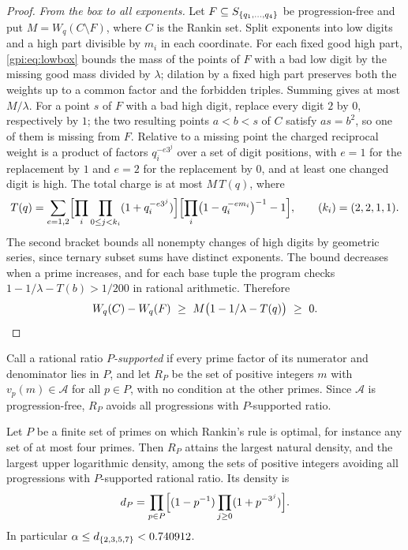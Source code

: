 \begin{proof}
\emph{From the box to all exponents.} Let $F\subseteq S_{\{q_1,\dots,q_4\}}$ be
progression-free and put $M=W_q(C\setminus F)$, where $C$ is the Rankin set. Split exponents
into low digits and a high part divisible by $m_i$ in each coordinate. For each fixed good
high part, \eqref{gpi:eq:lowbox} bounds the mass of the points of $F$ with a bad low digit by
the missing good mass divided by $\lambda$; dilation by a fixed high part preserves both the
weights up to a common factor and the forbidden triples. Summing gives at most $M/\lambda$.
For a point $s$ of $F$ with a bad high digit, replace every digit $2$ by $0$, respectively
by $1$; the two resulting points $a<b<s$ of $C$ satisfy $as=b^2$, so one of them is missing from
$F$. Relative to a missing point the charged reciprocal weight is a product of
factors $q_i^{-e3^j}$ over a set of digit positions, with $e=1$ for the replacement by $1$
and $e=2$ for the replacement by $0$, and at least one changed digit is high. The total
charge is at most $M\,T(q)$, where
\[
 T(q)=\sum_{e=1,2}\Bigl[\prod_i\prod_{0\le j<k_i}(1+q_i^{-e3^j})\Bigr]
 \Bigl[\prod_i\bigl(1-q_i^{-em_i}\bigr)^{-1}-1\Bigr],\qquad(k_i)=(2,2,1,1).
\]
The second bracket bounds all nonempty changes of high digits by geometric series, since
ternary subset sums have distinct exponents. The bound decreases when a prime increases, and
for each base tuple the program checks $1-1/\lambda-T(b)>1/200$ in rational arithmetic.
Therefore
\[
 W_q(C)-W_q(F)\ \ge\ M\bigl(1-1/\lambda-T(q)\bigr)\ \ge\ 0. \qedhere
\]
\end{proof}

Call a rational ratio \emph{$P$-supported} if every prime factor of its numerator and
denominator lies in $P$, and let $R_P$ be the set of positive integers $m$ with
$v_p(m)\in\mathcal A$ for all $p\in P$, with no condition at the other primes. Since
$\mathcal A$ is progression-free, $R_P$ avoids all progressions with $P$-supported ratio.

\begin{corollary}\label{gpi:cor:restricted}
Let $P$ be a finite set of primes on which Rankin's rule is optimal, for instance any set of
at most four primes. Then $R_P$ attains the largest natural density, and the largest upper
logarithmic density, among the sets of positive integers avoiding all progressions with
$P$-supported rational ratio. Its density is
\[
 d_P=\prod_{p\in P}\Bigl[(1-p^{-1})\prod_{j\ge0}(1+p^{-3^j})\Bigr].
\]
In particular $\alpha\le d_{\{2,3,5,7\}}<0.740912$.
\end{corollary}

